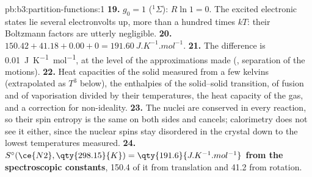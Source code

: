 \begin{solution}{pb:b3:partition-functions:1}
\textbf{19.} $g_0 = 1$ (${}^1\Sigma$): $R\ln1 = 0$. The excited electronic states lie several
electronvolts up, more than a hundred times $kT$: their Boltzmann factors are
utterly negligible.
\textbf{20.} $150.42 + 41.18 + 0.00 + 0 = \qty{191.60}{J.K^{-1}.mol^{-1}}$.
\textbf{21.} The difference is \qty{0.01}{J.K^{-1}.mol^{-1}}, at the level of the
approximations made (, separation of the motions).
\textbf{22.} Heat capacities of the solid measured from a few kelvins (extrapolated
as $T^3$ below), the enthalpies of the solid--solid transition, of fusion and
of vaporisation divided by their temperatures, the heat capacity of the gas,
and a correction for non-ideality.
\textbf{23.} The nuclei are conserved in every reaction, so their spin entropy is the
same on both sides and cancels; calorimetry does not see it either, since the
nuclear spins stay disordered in the crystal down to the lowest temperatures
measured.
\textbf{24.} \textbf{$S^\circ(\ce{N2}, \qty{298.15}{K}) = \qty{191.6}{J.K^{-1}.mol^{-1}}$ from the spectroscopic constants},
150.4 of it from translation and 41.2 from rotation.
\end{solution}
